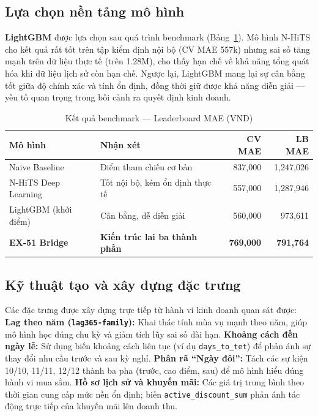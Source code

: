 \documentclass{article}
\begin{document}
\subsection{Lựa chọn nền tảng mô hình}

\textbf{LightGBM} được lựa chọn sau quá trình benchmark (Bảng~\ref{tab:benchmark}). Mô hình N-HiTS cho kết quả rất tốt trên tập kiểm định nội bộ (CV MAE 557k) nhưng sai số tăng mạnh trên dữ liệu thực tế (trên 1.28M), cho thấy hạn chế về khả năng tổng quát hóa khi dữ liệu lịch sử còn hạn chế.
Ngược lại, LightGBM mang lại sự cân bằng tốt giữa độ chính xác và tính ổn định, đồng thời giữ được khả năng diễn giải — yếu tố quan trọng trong bối cảnh ra quyết định kinh doanh.

\begin{table}[H]
\caption{Kết quả benchmark — Leaderboard MAE (VND)}
\label{tab:benchmark}
\centering
\small
\begin{tabular}{@{}p{4.5cm}p{5cm}rr@{}}
\toprule
Mô hình & Nhận xét & CV MAE & LB MAE \\
\midrule
Naive Baseline          & Điểm tham chiếu cơ bản                      & 837{,}000 & 1{,}247{,}026 \\
N-HiTS Deep Learning    & Tốt nội bộ, kém ổn định thực tế             & 557{,}000 & 1{,}287{,}946 \\
LightGBM (khởi điểm)   & Cân bằng, dễ diễn giải                      & 560{,}000 &   973{,}611 \\
\textbf{EX-51 Bridge}   & \textbf{Kiến trúc lai ba thành phần}        & \textbf{769{,}000} & \textbf{791{,}764} \\
\bottomrule
\end{tabular}
\end{table}

\subsection{Kỹ thuật tạo và xây dựng đặc trưng}

Các đặc trưng được xây dựng trực tiếp từ hành vi kinh doanh quan sát được:
\textbf{Lag theo năm (\texttt{lag365-family}):} Khai thác tính mùa vụ mạnh theo năm, giúp mô hình học đúng chu kỳ và giảm tích lũy sai số dài hạn.
\textbf{Khoảng cách đến ngày lễ:} Sử dụng biến khoảng cách liên tục (ví dụ \texttt{days\_to\_tet}) để phản ánh sự thay đổi nhu cầu trước và sau kỳ nghỉ.
\textbf{Phân rã “Ngày đôi”:} Tách các sự kiện 10/10, 11/11, 12/12 thành ba pha (trước, cao điểm, sau) để mô hình hiểu đúng hành vi mua sắm.
\textbf{Hồ sơ lịch sử và khuyến mãi:} Các giá trị trung bình theo thời gian cung cấp mức nền ổn định; biến \texttt{active\_discount\_sum} phản ánh tác động trực tiếp của khuyến mãi lên doanh thu.
\end{document}
